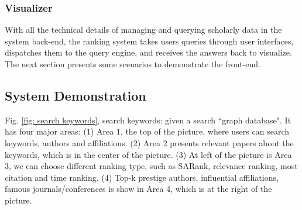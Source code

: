 \subsubsection{Visualizer}
With all the technical details of managing and querying scholarly data in the system back-end, the ranking system takes users queries through user interfaces, dispatches them to the query engine, and receives the answers back to visualize. The next section presents some scenarios to demonstrate the front-end.


\subsection{System Demonstration}
Fig. \ref{fig: search keywords}, search keywords: given a search ``graph database". It has four major areas: (1) Area 1, the top of the picture, where users can search keywords, authors and affiliations. (2) Area 2 presents relevant papers about the keywords, which is in the center of the picture. (3) At left of the picture is Area 3, we can choose different ranking type, such as SARank, relevance ranking, most citation and time ranking. (4) Top-k prestige authors, influential affiliations, famous journals/conferences is show in Area 4, which is at the right of the picture.


